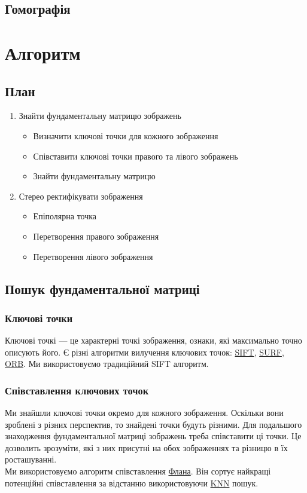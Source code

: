 \subsection{Гомографія}



\section{Алгоритм}
\subsection{План}
\begin{enumerate}
   \item Знайти фундаментальну матрицю зображень
   \begin{itemize}
     \item{Визначити ключові точки для кожного зображення}
     \item{Співставити ключові точки правого та лівого зображень}
     \item{Знайти фундаментальну матрицю}
   \end{itemize}
   \item Стерео ректифікувати зображення 
   \begin{itemize}
     \item{Епіполярна точка}
     \item{Перетворення правого зображення}
     \item{Перетворення лівого зображення}
   \end{itemize}
\end{enumerate}

\subsection{Пошук фундаментальної матриці}
\subsubsection{Ключові точки}
Ключові точкі --- це характерні точкі зображення, ознаки, які 
максимально точно описують його. Є різні алгоритми вилучення ключових точок:
\href{https://en.wikipedia.org/wiki/Scale-invariant_feature_transform}{SIFT},
\href{https://en.wikipedia.org/wiki/Speeded_up_robust_features}{SURF},
\href{https://ieeexplore.ieee.org/abstract/document/6126544}{ORB}. Ми 
використовуємо традиційний SIFT алгоритм.

\subsubsection{Співставлення ключових точок}
Ми знайшли ключові точки окремо для кожного зображення. Оскільки вони зроблені з
різних перспектив, то знайдені точки будуть різними. Для подальшого знаходження 
фундаментальної матриці зображень треба співставити ці точки. Це дозволить 
зрозуміти, які з них присутні на обох зображеннях та різницю в їх росташуванні. \\
Ми використовуємо алгоритм співставлення 
\href{https://github.com/flann-lib/flann}{Флана}. Він сортує найкращі потенційні
співставлення за відстанню використовуючи 
\href{https://en.wikipedia.org/wiki/K-nearest_neighbors_algorithm}{KNN} пошук.

